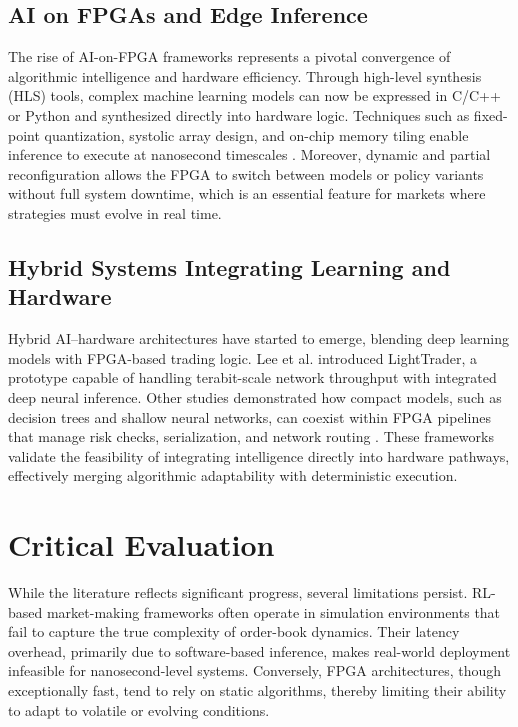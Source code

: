 \subsection{AI on FPGAs and Edge Inference}
The rise of AI-on-FPGA frameworks represents a pivotal convergence of algorithmic intelligence and hardware efficiency. Through high-level synthesis (HLS) tools, complex machine learning models can now be expressed in C/C++ or Python and synthesized directly into hardware logic. Techniques such as fixed-point quantization, systolic array design, and on-chip memory tiling enable inference to execute at nanosecond timescales \citep{NapatechND,Kuzmanovic2023,Fidus2024,Lattice2025,MDPI_SpecialIssue,Aouini2025,MarketsandMarkets2025}. Moreover, dynamic and partial reconfiguration allows the FPGA to switch between models or policy variants without full system downtime, which is an essential feature for markets where strategies must evolve in real time.

\subsection{Hybrid Systems Integrating Learning and Hardware}
Hybrid AI–hardware architectures have started to emerge, blending deep learning models with FPGA-based trading logic. Lee et al. \citep{Lee2023} introduced LightTrader, a prototype capable of handling terabit-scale network throughput with integrated deep neural inference. Other studies demonstrated how compact models, such as decision trees and shallow neural networks, can coexist within FPGA pipelines that manage risk checks, serialization, and network routing \citep{Kuzmanovic2023,NapatechND,Fidus2024}. These frameworks validate the feasibility of integrating intelligence directly into hardware pathways, effectively merging algorithmic adaptability with deterministic execution.

\section{Critical Evaluation}
\label{sec:critical_evaluation}
While the literature reflects significant progress, several limitations persist. RL-based market-making frameworks often operate in simulation environments that fail to capture the true complexity of order-book dynamics. Their latency overhead, primarily due to software-based inference, makes real-world deployment infeasible for nanosecond-level systems. Conversely, FPGA architectures, though exceptionally fast, tend to rely on static algorithms, thereby limiting their ability to adapt to volatile or evolving conditions.

